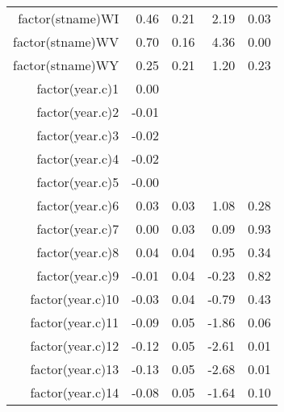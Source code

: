 \begin{table}[ht]
\begin{tabular}{rrrrr}
  factor(stname)WI & 0.46 & 0.21 & 2.19 & 0.03 \\ 
  factor(stname)WV & 0.70 & 0.16 & 4.36 & 0.00 \\ 
  factor(stname)WY & 0.25 & 0.21 & 1.20 & 0.23 \\ 
  factor(year.c)1 & 0.00 &  &  &  \\ 
  factor(year.c)2 & -0.01 &  &  &  \\ 
  factor(year.c)3 & -0.02 &  &  &  \\ 
  factor(year.c)4 & -0.02 &  &  &  \\ 
  factor(year.c)5 & -0.00 &  &  &  \\ 
  factor(year.c)6 & 0.03 & 0.03 & 1.08 & 0.28 \\ 
  factor(year.c)7 & 0.00 & 0.03 & 0.09 & 0.93 \\ 
  factor(year.c)8 & 0.04 & 0.04 & 0.95 & 0.34 \\ 
  factor(year.c)9 & -0.01 & 0.04 & -0.23 & 0.82 \\ 
  factor(year.c)10 & -0.03 & 0.04 & -0.79 & 0.43 \\ 
  factor(year.c)11 & -0.09 & 0.05 & -1.86 & 0.06 \\ 
  factor(year.c)12 & -0.12 & 0.05 & -2.61 & 0.01 \\ 
  factor(year.c)13 & -0.13 & 0.05 & -2.68 & 0.01 \\ 
  factor(year.c)14 & -0.08 & 0.05 & -1.64 & 0.10 \\ 
   \hline
\end{tabular}
\end{table}
